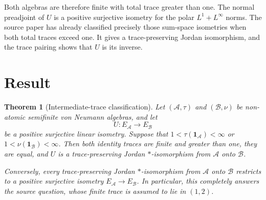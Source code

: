 \documentclass[11pt]{article}
\newtheorem{theorem}{Theorem}
\newcommand{\A}{\mathcal A}
\newcommand{\B}{\mathcal B}
\newcommand{\one}{\mathbf 1}
\begin{document}
Both algebras are therefore finite with total trace greater than one.  The
normal preadjoint of $U$ is a positive surjective isometry for the polar
\(L^1+L^\infty\) norms.  The source paper has already classified precisely
those sum-space isometries when both total traces exceed one.  It gives a
trace-preserving Jordan isomorphism, and the trace pairing shows that $U$ is
its inverse.

\section{Result}

\begin{theorem}[Intermediate-trace classification]\label{thm:main}
Let $(\A,\tau)$ and $(\B,\nu)$ be non-atomic semifinite von Neumann algebras,
and let
\[
 U:E_\A\longrightarrow E_\B
\]
be a positive surjective linear isometry.  Suppose that
\(1<\tau(\one_\A)<\infty\) or \(1<\nu(\one_\B)<\infty\).  Then both identity
traces are finite and greater than one, they are equal, and $U$ is a
trace-preserving Jordan $*$-isomorphism from $\A$ onto $\B$.

Conversely, every trace-preserving Jordan $*$-isomorphism from $\A$ onto
$\B$ restricts to a positive surjective isometry $E_\A\to E_\B$.
In particular, this completely answers the source question, whose finite
trace is assumed to lie in $(1,2)$.
\end{theorem}
\end{document}
